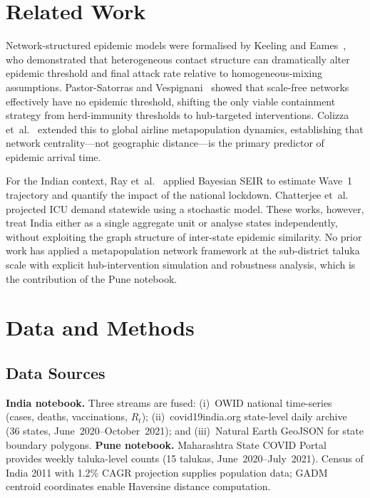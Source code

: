 \documentclass[sigconf,authordraft]{acmart}
\begin{document}
\section{Related Work}
\label{sec:related}

Network-structured epidemic models were formalised by Keeling and
Eames~\cite{Keeling2005}, who demonstrated that heterogeneous contact
structure can dramatically alter epidemic threshold and final attack rate
relative to homogeneous-mixing assumptions. Pastor-Satorras and
Vespignani~\cite{PastorSatorras2001} showed that scale-free networks
effectively have no epidemic threshold, shifting the only viable containment
strategy from herd-immunity thresholds to hub-targeted interventions.
Colizza et~al.~\cite{Colizza2007} extended this to global airline
metapopulation dynamics, establishing that network centrality---not
geographic distance---is the primary predictor of epidemic arrival time.

For the Indian context, Ray et~al.~\cite{Ray2020} applied Bayesian SEIR
to estimate Wave~1 trajectory and quantify the impact of the national
lockdown. Chatterjee et~al.~\cite{Chatterjee2020} projected ICU demand
statewide using a stochastic model. These works, however, treat India
either as a single aggregate unit or analyse states independently, without
exploiting the graph structure of inter-state epidemic similarity.
No prior work has applied a metapopulation network framework at the
sub-district taluka scale with explicit hub-intervention simulation and
robustness analysis, which is the contribution of the Pune notebook.

\section{Data and Methods}
\label{sec:methods}

\subsection{Data Sources}

\textbf{India notebook.} Three streams are fused: (i)~OWID national
time-series~\cite{OWID2020} (cases, deaths, vaccinations, $R_t$);
(ii)~covid19india.org state-level daily archive~\cite{covid19india}
(36 states, June~2020--October~2021); and (iii)~Natural Earth GeoJSON
for state boundary polygons. \textbf{Pune notebook.} Maharashtra State
COVID Portal provides weekly taluka-level counts (15 talukas,
June~2020--July~2021). Census of India 2011 with 1.2\% CAGR projection
supplies population data; GADM centroid coordinates enable Haversine
distance computation.
\end{document}
